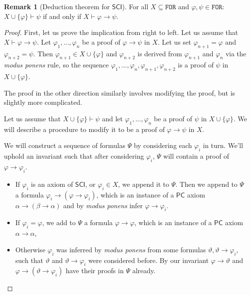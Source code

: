 \documentclass{article}
\theoremstyle{definition}
\theoremstyle{definition}
\theoremstyle{definition}
\newtheorem{remark}{Remark}[section]
\newcommand*{\ra}{\rightarrow}
\newcommand*{\FOR}{\texttt{FOR}}
\newcommand{\SCI}{$\mathsf{SCI}$\xspace}
\newcommand{\PC}{$\mathsf{PC}$\xspace}
\begin{document}
\begin{remark}[Deduction theorem for \SCI]
    For all $X \subseteq \FOR$ and $\varphi, \psi \in \FOR$: $X \cup \{\varphi\} \vdash \psi$ if and only if $X \vdash \varphi \ra \psi$.
    \begin{proof}
        First, let us prove the implication from right to left. Let us assume that $X \vdash \varphi \ra \psi$. Let $\varphi_1, ..., \varphi_n$ be a proof of $\varphi \ra \psi$ in $X$. Let us set $\varphi_{n+1} = \varphi$ and $\varphi_{n+2} = \psi$. Then $\varphi_{n+1} \in X \cup \{\varphi\}$ and $\varphi_{n+2}$ is derived from $\varphi_{n+1}$ and $\varphi_{n}$ via the \emph{modus ponens} rule, so the sequence $\varphi_1, ..., \varphi_n, \varphi_{n+1}, \varphi_{n+2}$ is a proof of $\psi$ in $X \cup \{\varphi\}$.

        The proof in the other direction similarly involves modifying the proof, but is
        slightly more complicated.

        Let us assume that $X \cup \{\varphi\} \vdash \psi$ and let $\varphi_1, ...,
            \varphi_n$ be a proof of $\psi$ in $X \cup \{\varphi\}$. We will describe a
        procedure to modify it to be a proof of $\varphi \ra \psi$ in $X$.

        We will construct a sequence of formulas $\Psi$ by considering each $\varphi_i$
        in turn. We'll uphold an invariant such that after considering $\varphi_i$,
        $\Psi$ will contain a proof of $\varphi \ra \varphi_i$.

        \begin{itemize}
            \item If $\varphi_i$ is an axiom of \SCI, or $\varphi_i \in X$, we append it to
                  $\Psi$. Then we append to $\Psi$ a formula $\varphi_i \ra (\varphi \ra
                      \varphi_i)$, which is an instance of a \PC axiom $\alpha \ra (\beta \ra
                      \alpha)$ and by \emph{modus ponens} infer $\varphi \ra \varphi_i$.
            \item If $\varphi_i = \varphi$, we add to $\Psi$ a formula $\varphi \ra \varphi$,
                  which is an instance of a \PC axiom $\alpha \ra \alpha$,
            \item Otherwise $\varphi_i$ was inferred by \emph{modus ponens} from some formulas
                  $\vartheta, \vartheta \ra \varphi_i$, such that $\vartheta$ and $\vartheta \ra
                      \varphi_i$ were considered before. By our invariant $\varphi \ra \vartheta$ and
                  $\varphi \ra (\vartheta \ra \varphi_i)$ have their proofs in $\Psi$ already.


\end{itemize}
\end{proof}
\end{remark}
\end{document}
